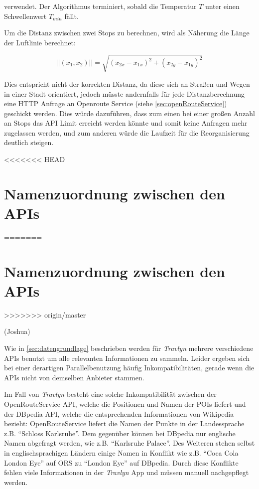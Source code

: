 		verwendet. Der Algorithmus terminiert, sobald die Temperatur $T$ unter einen Schwellenwert $T_{min}$ fällt. 
	
		Um die Distanz zwischen zwei Stops zu berechnen, wird als Näherung die Länge der Luftlinie berechnet: 
		
		\begin{equation}
			||(x_1, x_2)|| = \sqrt{ ( x_{2x} - x_{1x} )^2  + ( x_{2y} - x_{1y} )^2 }
		\end{equation}
		
		Dies entspricht nicht der korrekten Distanz, da diese sich an Straßen und Wegen in einer Stadt orientiert, jedoch müsste andernfalls für jede Distanzberechnung eine \acs{HTTP} Anfrage an Openroute Service (siehe \autoref{sec:openRouteService}) geschickt werden. Dies würde dazuführen, dass zum einen bei einer großen Anzahl an Stops das API Limit erreicht werden könnte und somit keine Anfragen mehr zugelassen werden, und zum anderen würde die Laufzeit für die Reorganisierung deutlich steigen.
		 
<<<<<<< HEAD
	\section{Namenzuordnung zwischen den \acs{API}s}
	\label{implementation.mapping}
=======
	\section{Namenzuordnung zwischen den \acs{API}s} \label{sec:mapping}
>>>>>>> origin/master
	
		(Joshua)
		
		Wie in \autoref{sec:datengrundlage} beschrieben werden für \textit{Travlyn} mehrere verschiedene \acs{API}s benutzt um alle relevanten Informationen zu sammeln. Leider ergeben sich bei einer derartigen Parallelbenutzung häufig Inkompatibilitäten, gerade wenn die \acs{API}s nicht von demselben Anbieter stammen.
		
		\vspace{0.25cm}
		
		Im Fall von \textit{Travlyn} besteht eine solche Inkompatibilität zwischen der OpenRouteService \acs{API}, welche die Positionen und Namen der \acs{POI}s liefert und der DBpedia \acs{API}, welche die entsprechenden Informationen von Wikipedia bezieht: OpenRouteService liefert die Namen der Punkte in der Landessprache z.B. \enquote{Schloss Karlsruhe}. Dem gegenüber können bei DBpedia nur englische Namen abgefragt werden, wie z.B. \enquote{Karlsruhe Palace}. Des Weiteren stehen selbst in englischsprachigen Ländern einige Namen in Konflikt wie z.B. \enquote{Coca Cola London Eye} auf \acs{ORS} zu \enquote{London Eye} auf DBpedia. Durch diese Konflikte fehlen viele Informationen in der \textit{Travlyn} App und müssen manuell nachgepflegt werden.
		
